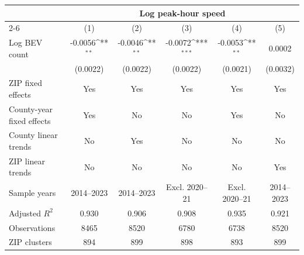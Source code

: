 {
\def\sym#1{\ifmmode^{#1}\else\(^{#1}\)\fi}
\begin{tabular}{l*{5}{c}}
\hline\hline
                    &\multicolumn{5}{c}{Log peak-hour speed}                                                                      \\\cmidrule(lr){2-6}
                    &\multicolumn{1}{c}{(1)}         &\multicolumn{1}{c}{(2)}         &\multicolumn{1}{c}{(3)}         &\multicolumn{1}{c}{(4)}         &\multicolumn{1}{c}{(5)}         \\
\hline
Log BEV count       &     -0.0056\sym{**} &     -0.0046\sym{**} &     -0.0072\sym{***}&     -0.0053\sym{**} &      0.0002         \\
                    &    (0.0022)         &    (0.0022)         &    (0.0022)         &    (0.0021)         &    (0.0032)         \\
\hline
ZIP fixed effects   &         Yes         &         Yes         &         Yes         &         Yes         &         Yes         \\
County-year fixed effects&         Yes         &          No         &          No         &         Yes         &          No         \\
County linear trends&          No         &         Yes         &          No         &          No         &          No         \\
ZIP linear trends   &          No         &          No         &          No         &          No         &         Yes         \\
Sample years        &  2014--2023         &  2014--2023         &Excl. 2020--21         &Excl. 2020--21         &  2014--2023         \\
Adjusted \(R^2\)    &       0.930         &       0.906         &       0.908         &       0.935         &       0.921         \\
Observations        &        8465         &        8520         &        6780         &        6738         &        8520         \\
ZIP clusters        &         894         &         899         &         898         &         893         &         899         \\
\hline\hline
\end{tabular}
}
